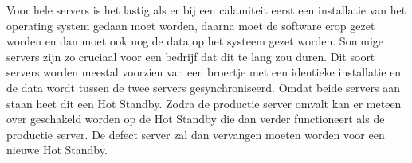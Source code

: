 Voor hele servers is het lastig als er bij een calamiteit eerst een installatie van het operating system gedaan moet worden, daarna moet de software erop gezet worden en dan moet ook nog de data op het systeem gezet worden. Sommige servers zijn zo cruciaal voor een bedrijf dat dit te lang zou duren. Dit soort servers worden meestal voorzien van een broertje met een identieke installatie en de data wordt tussen de twee servers gesynchroniseerd. Omdat beide servers aan staan heet dit een Hot Standby. Zodra de productie server omvalt kan er meteen over geschakeld worden op de Hot Standby die dan verder functioneert als de productie server. De defect server zal dan vervangen moeten worden voor een nieuwe Hot Standby.

